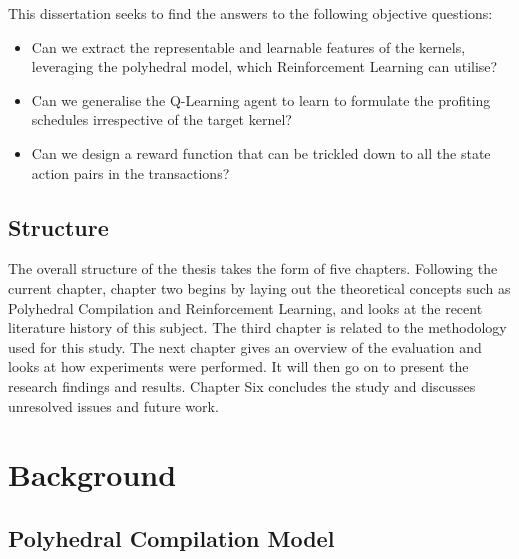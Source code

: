 \documentclass[logo,msc]{infthesis}           %
\begin{document}
This dissertation seeks to find the answers to the following objective questions:
\begin{itemize}

    \item Can we extract the representable and learnable features of the kernels, leveraging the polyhedral model, which Reinforcement Learning can utilise? 
    \item Can we generalise the Q-Learning agent to learn to formulate the profiting schedules irrespective of the target kernel?
    \item Can we design a reward function that can be trickled down to all the state action pairs in the transactions?

\end{itemize}

\section{Structure}

The overall structure of the thesis takes the form of five chapters. Following the current chapter, chapter two begins by laying out the theoretical concepts such as Polyhedral Compilation and Reinforcement Learning, and looks at the recent literature history of this subject. The third chapter is related to the methodology used for this study. The next chapter gives an overview of the evaluation and looks at how experiments were performed. It will then go on to present the research findings and results. Chapter Six concludes the study and discusses unresolved issues and future work.

\chapter{Background}

\section{Polyhedral Compilation Model}
\end{document}
